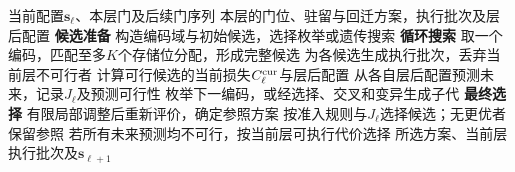 \begin{algorithm}[!htb]
\caption{}
\label{alg:solver}
\small
\begin{PaperRevisionBlock}
\algrenewcommand{}
\algrenewcommand{}
\algrenewcommand{}
\algrenewcommand\algorithmicdo{}
\algrenewcommand{}
\begin{algorithmic}[1]
\Require 当前配置$\mathbf{s}_\ell$、本层门及后续门序列
\Ensure 本层的门位、驻留与回迁方案，执行批次及层后配置
\Statex \textbf{候选准备}
\State 构造编码域与初始候选，选择枚举或遗传搜索
\Statex \textbf{循环搜索}
  \State 取一个编码，匹配至多$K$个存储位分配，形成完整候选
  \State 为各候选生成执行批次，丢弃当前层不可行者
  \State 计算可行候选的当前损失$C_\ell^{\rm cur}$与层后配置
  \State 从各自层后配置预测未来，记录$J_\ell$及预测可行性
  \State 枚举下一编码，或经选择、交叉和变异生成子代
\EndWhile
\Statex \textbf{最终选择}
\State 有限局部调整后重新评价，确定参照方案
\State 按准入规则与$J_\ell$选择候选；无更优者保留参照
\State 若所有未来预测均不可行，按当前层可执行代价选择
\State \Return 所选方案、当前层执行批次及$\mathbf{s}_{\ell+1}$
\end{algorithmic}
\end{PaperRevisionBlock}
\end{algorithm}
